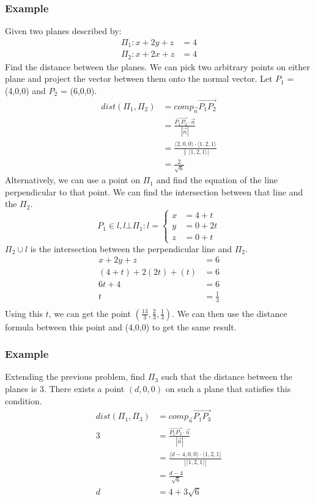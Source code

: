 \documentclass[letterpaper, 12pt]{math}
\begin{document}
\subsubsection*{Example}
Given two planes described by:
\begin{align*}
  \Pi_1: x+2y+z &= 4 \\
  \Pi_2: x+2x+z &= 4
\end{align*}
Find the distance between the planes. We can pick two arbitrary points on either
plane and project the vector between them onto the normal vector. Let \( P_1 \)
= (4,0,0) and \( P_2 \) = (6,0,0).
\begin{align*}
  dist(\Pi_1,\Pi_2) &= comp_{\vec{n}}\overrightarrow{P_1P_2} \\
  &= \frac{\overrightarrow{P_1P_2}\cdot\vec{n}}{|\vec{n}|} \\
  &= \frac{\langle2,0,0\rangle\cdot\langle1,2,1\rangle}
    {\|\langle1,2,1\rangle|} \\
  &= \frac{2}{\sqrt{6}}
\end{align*}
Alternatively, we can use a point on \( \Pi_1 \) and find the equation of the
line perpendicular to that point. We can find the intersection between that
line and the \( \Pi_2 \).
\[ P_1\in l,l\bot\Pi_1: l = \begin{cases}
  x &= 4+t \\
  y &= 0+2t \\
  z &= 0+t
\end{cases} \]
\( \Pi_2\cup l \) is the intersection between the perpendicular line and
\( \Pi_2 \).
\begin{align*}
  x+2y+z &= 6 \\
  (4+t)+2(2t)+(t) &= 6 \\
  6t+4 &= 6 \\
  t &= \frac{1}{3} \\
\end{align*}
Using this \( t \), we can get the point
\( (\frac{13}{3},\frac{2}{3},\frac{1}{3}) \). We can then use the distance
formula between this point and (4,0,0) to get the same result.

\subsubsection*{Example}
Extending the previous problem, find \( \Pi_3 \) such that the distance between
the planes is 3. There exists a point \( (d,0,0) \) on such a plane that
satisfies this condition.
\begin{align*}
  dist(\Pi_1,\Pi_3) &= comp_{\vec{n}}{\overrightarrow{P_1P_3}} \\
  3 &= \frac{\overrightarrow{P_1P_3}\cdot\vec{n}}{|\vec{n}|} \\
  &= \frac{\langle d-4,0,0\rangle\cdot\langle1,2,1\rangle}
    {|\langle1,2,1\rangle|} \\
  &= \frac{d-4}{\sqrt{6}} \\
  d &= 4+3\sqrt{6}
\end{align*}
\end{document}
